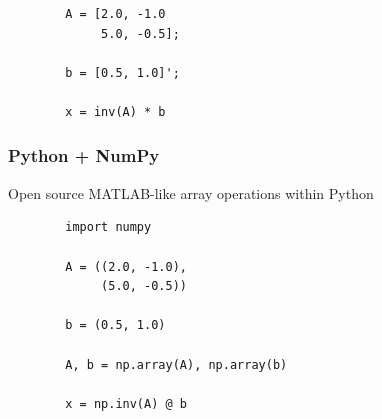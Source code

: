 \begin{frame}[fragile]
    
    \begin{verbatim}
        A = [2.0, -1.0
             5.0, -0.5];

        b = [0.5, 1.0]';

        x = inv(A) * b
    \end{verbatim}
    
\end{frame}



    


\begin{frame}
    \frametitle{Python + NumPy}

    Open source MATLAB-like array operations within Python

    \begin{figure}
       \begin{center} %
       \end{center}
    \end{figure}

\end{frame}

\begin{frame}[fragile]

    \begin{verbatim}
        import numpy 

        A = ((2.0, -1.0),
             (5.0, -0.5))

        b = (0.5, 1.0)

        A, b = np.array(A), np.array(b)

        x = np.inv(A) @ b
    \end{verbatim}

\end{frame}

